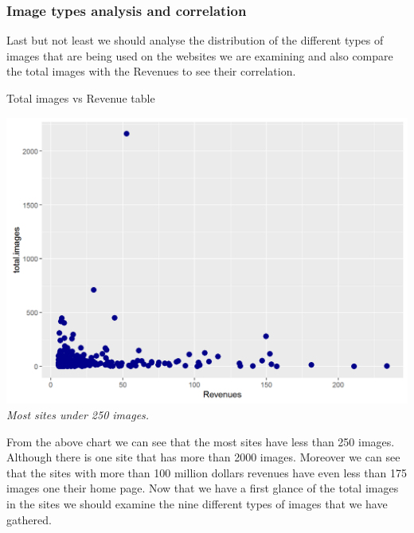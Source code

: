 \documentclass{book}
\begin{document}
\subsubsection{Image types analysis and correlation}
Last but not least we should analyse the distribution of the different types of images that are being used on the websites we are examining and also compare the total images with the Revenues to see their correlation.
\begin{table}[H]
\centering
\caption{Total images vs Revenue table}
\begin{center}
\includegraphics[scale=0.5]{../R/photos/53_timg_rev.png}    \\
\textit{Most sites under 250 images.}
\end{center}
\end{table}
From the above chart we can see that the most sites have less than 250 images. Although there is one site that has more than 2000 images. Moreover we can see that the sites with more than 100 million dollars revenues have even less than 175 images one their home page. Now that we have a first glance of the total images in the sites we should examine the nine different types of images that we have gathered.
\end{document}
